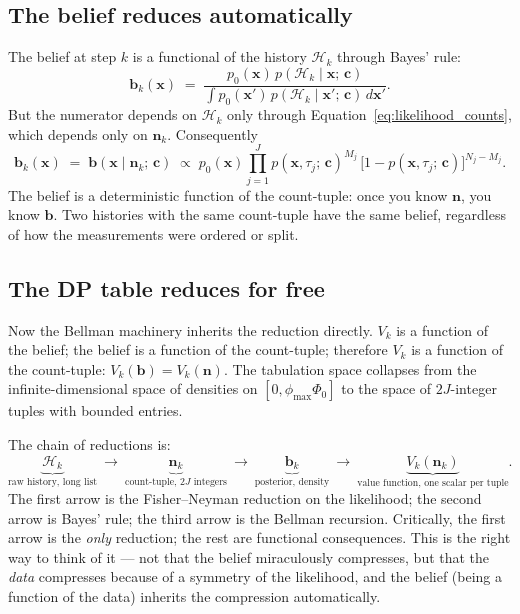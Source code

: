 \documentclass[11pt]{article}
\newcommand{\bc}{\bm{c}}
\newcommand{\bx}{\bm{x}}
\newcommand{\bb}{\bm{b}}
\begin{document}
\subsection{The belief reduces automatically}

The belief at step $k$ is a functional of the history $\mathcal{H}_k$ through Bayes' rule:
\begin{equation}
\bb_k(\bx) \;=\; \frac{p_0(\bx)\, p(\mathcal{H}_k \mid \bx;\, \bc)}{\int p_0(\bx')\, p(\mathcal{H}_k \mid \bx';\, \bc)\, d\bx'}.
\end{equation}
But the numerator depends on $\mathcal{H}_k$ only through Equation~\eqref{eq:likelihood_counts}, which depends only on $\mathbf{n}_k$.  Consequently
\begin{equation}
\bb_k(\bx) \;=\; \bb(\bx \mid \mathbf{n}_k;\, \bc) \;\propto\; p_0(\bx) \prod_{j=1}^J p(\bx, \tau_j;\, \bc)^{M_j}\,\bigl[1 - p(\bx, \tau_j;\, \bc)\bigr]^{N_j - M_j}.
\label{eq:belief_from_counts}
\end{equation}
The belief is a deterministic function of the count-tuple: once you know $\mathbf{n}$, you know $\bb$.  Two histories with the same count-tuple have the same belief, regardless of how the measurements were ordered or split.

\subsection{The DP table reduces for free}

Now the Bellman machinery inherits the reduction directly.  $V_k$ is a function of the belief; the belief is a function of the count-tuple; therefore $V_k$ is a function of the count-tuple: $V_k(\bb) = V_k(\mathbf{n})$.  The tabulation space collapses from the infinite-dimensional space of densities on $[0, \phi_{\max} \Phi_0]$ to the space of $2J$-integer tuples with bounded entries.

The chain of reductions is:
\begin{equation*}
\underbrace{\mathcal{H}_k}_{\text{raw history, long list}}\ \longrightarrow\ \underbrace{\mathbf{n}_k}_{\text{count-tuple, } 2J \text{ integers}}\ \longrightarrow\ \underbrace{\bb_k}_{\text{posterior, density}}\ \longrightarrow\ \underbrace{V_k(\mathbf{n}_k)}_{\text{value function, one scalar per tuple}}.
\end{equation*}
The first arrow is the Fisher--Neyman reduction on the likelihood; the second arrow is Bayes' rule; the third arrow is the Bellman recursion.  Critically, the first arrow is the \emph{only} reduction; the rest are functional consequences.  This is the right way to think of it --- not that the belief miraculously compresses, but that the \emph{data} compresses because of a symmetry of the likelihood, and the belief (being a function of the data) inherits the compression automatically.
\end{document}
